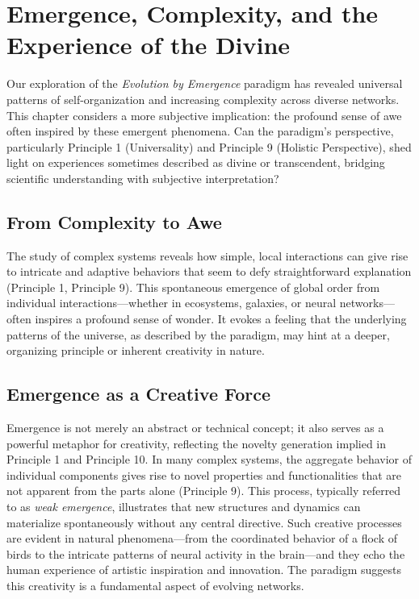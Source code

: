\chapter{Emergence, Complexity, and the Experience of the Divine} %
\label{ch:EmergenceDivine}

Our exploration of the \emph{Evolution by Emergence} paradigm has revealed universal patterns of self-organization and increasing complexity across diverse networks. This chapter considers a more subjective implication: the profound sense of awe often inspired by these emergent phenomena. Can the paradigm's perspective, particularly Principle 1 (Universality) and Principle 9 (Holistic Perspective), shed light on experiences sometimes described as divine or transcendent, bridging scientific understanding with subjective interpretation? %

\section{From Complexity to Awe}
The study of complex systems reveals how simple, local interactions can give rise to intricate and adaptive behaviors that seem to defy straightforward explanation (Principle 1, Principle 9). This spontaneous emergence of global order from individual interactions—whether in ecosystems, galaxies, or neural networks—often inspires a profound sense of wonder. It evokes a feeling that the underlying patterns of the universe, as described by the paradigm, may hint at a deeper, organizing principle or inherent creativity in nature.

\section{Emergence as a Creative Force}
Emergence is not merely an abstract or technical concept; it also serves as a powerful metaphor for creativity, reflecting the novelty generation implied in Principle 1 and Principle 10. In many complex systems, the aggregate behavior of individual components gives rise to novel properties and functionalities that are not apparent from the parts alone (Principle 9). This process, typically referred to as \emph{weak emergence}, illustrates that new structures and dynamics can materialize spontaneously without any central directive. Such creative processes are evident in natural phenomena—from the coordinated behavior of a flock of birds to the intricate patterns of neural activity in the brain—and they echo the human experience of artistic inspiration and innovation. The paradigm suggests this creativity is a fundamental aspect of evolving networks. %

